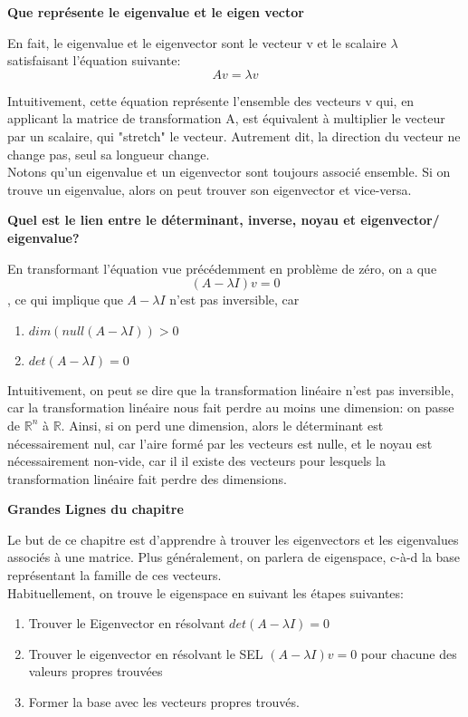 \documentclass{article}
\begin{document}
\textbf{Que représente le eigenvalue et le eigen vector}

En fait, le eigenvalue et le eigenvector sont le vecteur v et le scalaire
$\lambda$ satisfaisant l'équation suivante:
$$ Av = \lambda v $$

Intuitivement, cette équation représente l'ensemble des vecteurs v qui,
en applicant la matrice de transformation A, est équivalent à multiplier le
vecteur par un scalaire, qui "stretch" le vecteur. Autrement dit, la direction
du vecteur ne change pas, seul sa longueur change.\\

Notons qu'un eigenvalue et un eigenvector sont toujours associé ensemble. Si
on trouve un eigenvalue, alors on peut trouver son eigenvector et vice-versa.

\textbf{Quel est le lien entre le déterminant, inverse, noyau et eigenvector/
eigenvalue?}

En transformant l'équation vue précédemment en problème de zéro, on a que
$$ (A- \lambda I)v = 0 $$, ce qui implique que $ A - \lambda I $
n'est pas inversible, car
\begin{enumerate}
    \item $ dim(null(A-\lambda I)) > 0 $
    \item $ det(A -\lambda I) = 0 $
\end{enumerate}

Intuitivement, on peut se dire que la transformation linéaire n'est pas
inversible, car la transformation linéaire nous fait perdre au moins une
dimension: on passe de $\mathbb{R}^n$ à $\mathbb{R}$. Ainsi, si on perd une
dimension, alors le déterminant est nécessairement nul, car l'aire formé par
les vecteurs est nulle, et le noyau est nécessairement non-vide, car il
il existe des vecteurs pour lesquels la transformation linéaire fait perdre
des dimensions.

\textbf{Grandes Lignes du chapitre}

Le but de ce chapitre est d'apprendre à trouver les eigenvectors et les
eigenvalues associés à une matrice. Plus généralement, on parlera de eigenspace,
c-à-d la base représentant la famille de ces vecteurs.\\

Habituellement, on trouve le eigenspace en suivant les étapes suivantes:
\begin{enumerate}
    \item Trouver le Eigenvector en résolvant $ det(A-\lambda I)=0$
    \item Trouver le eigenvector en résolvant le SEL $ (A - \lambda I)v=0 $
	pour chacune des valeurs propres trouvées
    \item Former la base avec les vecteurs propres trouvés.
\end{enumerate}
\end{document}
